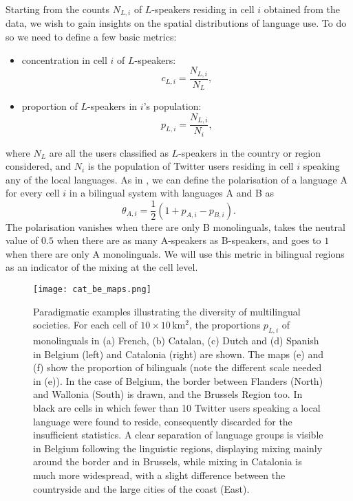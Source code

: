 \documentclass[../thesis.tex]{subfiles}
\begin{document}
Starting from the counts $N_{L,i}$ of $L$-speakers residing in cell $i$ obtained from
the data, we wish to gain insights on the spatial distributions of language use. To do
so we need to define a few basic metrics:
\begin{itemize}
  \item concentration in cell $i$ of $L$-speakers:
    \begin{equation}
    \label{eq:def_conc}
          c_{L,i} = \frac{N_{L,i}}{N_L},
    \end{equation}
  \item proportion of $L$-speakers in $i$'s population:
    \begin{equation}
    \label{eq:def_prop}
          p_{L,i} = \frac{N_{L,i}}{N_i},
    \end{equation}
\end{itemize}
where $N_L$ are all the users classified as $L$-speakers in the country or region
considered, and $N_i$ is the population of Twitter users residing in cell $i$ speaking
any of the local languages. As in \cite{MocanuTwitterBabel2013}, we can define the
polarisation of a language A for every cell $i$ in a bilingual system with languages A
and B as 
\begin{equation}
\label{eq:def_polar}
  \theta_{A, i} = \frac{1}{2} (1 + p_{A,i} - p_{B,i}). 
\end{equation}
The polarisation vanishes when there are only B monolinguals, takes the neutral value of
$0.5$ when there are as many A-speakers as B-speakers, and goes to $1$ when there are
only A monolinguals. We will use this metric in bilingual regions as an indicator of the
mixing at the cell level. 

\begin{figure*}[p!]
  \centering
  \texttt{[image: cat\_be\_maps.png]}
  \caption{Paradigmatic examples illustrating the diversity of multilingual societies.
  For each cell of $10 \times 10 \, \si{\kilo \meter \squared}$, the proportions
  $p_{L,i}$ of monolinguals in (a) French, (b) Catalan, (c) Dutch and (d) Spanish in
  Belgium (left) and Catalonia (right) are shown. The maps (e) and (f) show the
  proportion of bilinguals (note the different scale needed in (e)). In the case of
  Belgium, the border between Flanders (North) and Wallonia (South) is drawn, and the
  Brussels Region too. In black are cells in which fewer than 10 Twitter users speaking
  a local language were found to reside, consequently discarded for the insufficient
  statistics. A clear separation of language groups is visible in Belgium following the
  linguistic regions, displaying mixing mainly around the border and in Brussels, while
  mixing in Catalonia is much more widespread, with a slight difference between the
  countryside and the large cities of the coast (East).}
  \label{fig:cat_be_maps}
\end{figure*}
\end{document}
